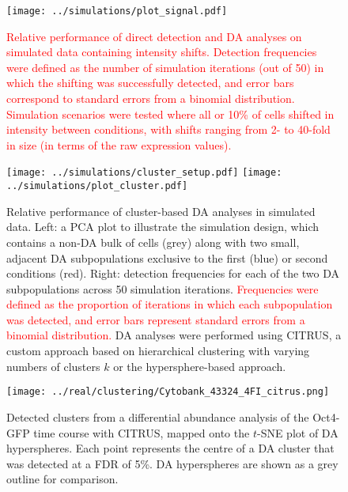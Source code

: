 \documentclass{article}
\newcommand\revised[1]{\textcolor{red}{#1}}
\begin{document}
\begin{figure}[p]
    \begin{center}
        \texttt{[image: ../simulations/plot\_signal.pdf]}
    \end{center}
    \caption{\revised{Relative performance of direct detection and DA analyses on simulated data containing intensity shifts.
        Detection frequencies were defined as the number of simulation iterations (out of 50) in which the shifting was successfully detected,
        and error bars correspond to standard errors from a binomial distribution.
        Simulation scenarios were tested where all or 10\% of cells shifted in intensity between conditions,
        with shifts ranging from 2- to 40-fold in size (in terms of the raw expression values).
}}
    \label{fig:shiftsim}
\end{figure}

\begin{figure}[p]
\begin{center}
\texttt{[image: ../simulations/cluster\_setup.pdf]}
\texttt{[image: ../simulations/plot\_cluster.pdf]}
\end{center}
\caption{Relative performance of cluster-based DA analyses in simulated data.
    Left: a PCA plot to illustrate the simulation design, which contains a non-DA bulk of cells (grey) along with two small, adjacent DA subpopulations exclusive to the first (blue) or second conditions (red).
    Right: detection frequencies for each of the two DA subpopulations across 50 simulation iterations.
    \revised{Frequencies were defined as the proportion of iterations in which each subpopulation was detected, and error bars represent standard errors from a binomial distribution.}
    DA analyses were performed using CITRUS, a custom approach based on hierarchical clustering with varying numbers of clusters $k$ or the hypersphere-based approach.
}
\label{fig:clustersim}
\end{figure}

\begin{figure}[p]
\begin{center}
\texttt{[image: ../real/clustering/Cytobank\_43324\_4FI\_citrus.png]}
\end{center}
\caption{Detected clusters from a differential abundance analysis of the Oct4-GFP time course with CITRUS, mapped onto the $t$-SNE plot of DA hyperspheres.
Each point represents the centre of a DA cluster that was detected at a FDR of 5\%.
DA hyperspheres are shown as a grey outline for comparison.
}
\label{fig:clusterreal}
\end{figure}
\end{document}

